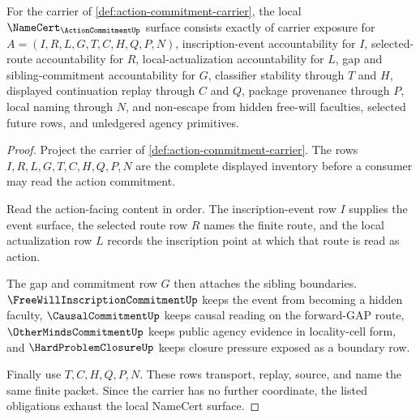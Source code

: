 \begin{theorem}
\label{thm:action-commitment-namecert-obligations}
For the carrier of \autoref{def:action-commitment-carrier}, the local $\NameCert_{\ActionCommitmentUp}$ surface consists exactly of carrier exposure for $A=(I,R,L,G,T,C,H,Q,P,N)$, inscription-event accountability for $I$, selected-route accountability for $R$, local-actualization accountability for $L$, gap and sibling-commitment accountability for $G$, classifier stability through $T$ and $H$, displayed continuation replay through $C$ and $Q$, package provenance through $P$, local naming through $N$, and non-escape from hidden free-will faculties, selected future rows, and unledgered agency primitives.
\end{theorem}
\begin{proof}
Project the carrier of \autoref{def:action-commitment-carrier}. The rows $I,R,L,G,T,C,H,Q,P,N$ are the complete displayed inventory before a consumer may read the action commitment.

Read the action-facing content in order. The inscription-event row $I$ supplies the event surface, the selected route row $R$ names the finite route, and the local actualization row $L$ records the inscription point at which that route is read as action.

The gap and commitment row $G$ then attaches the sibling boundaries. $\FreeWillInscriptionCommitmentUp$ keeps the event from becoming a hidden faculty, $\CausalCommitmentUp$ keeps causal reading on the forward-GAP route, $\OtherMindsCommitmentUp$ keeps public agency evidence in locality-cell form, and $\HardProblemClosureUp$ keeps closure pressure exposed as a boundary row.

Finally use $T,C,H,Q,P,N$. These rows transport, replay, source, and name the same finite packet. Since the carrier has no further coordinate, the listed obligations exhaust the local NameCert surface.
\end{proof}

